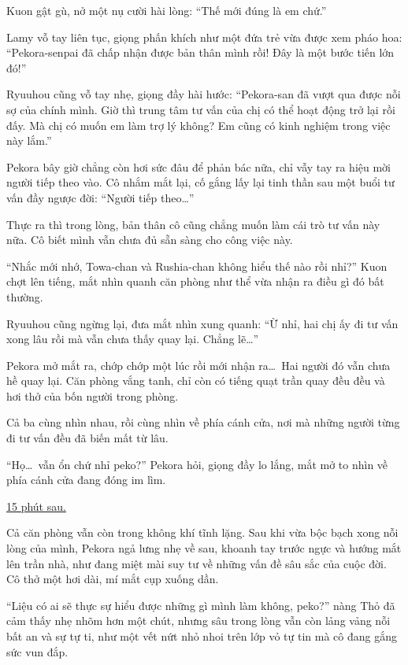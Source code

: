 \documentclass[../main.tex]{subfiles}
\begin{document}
Kuon gật gù, nở một nụ cười hài lòng: ``Thế mới đúng là em chứ.''

Lamy vỗ tay liên tục, giọng phấn khích như một đứa trẻ vừa được xem pháo hoa: ``Pekora-senpai đã chấp nhận được bản thân mình rồi! Đây là một bước tiến lớn đó!''

Ryuuhou cũng vỗ tay nhẹ, giọng đầy hài hước: ``Pekora-san đã vượt qua được nỗi sợ của chính mình. Giờ thì trung tâm tư vấn của chị có thể hoạt động trở lại rồi đấy. Mà chị có muốn em làm trợ lý không? Em cũng có kinh nghiệm trong việc này lắm.''

Pekora bây giờ chẳng còn hơi sức đâu để phản bác nữa, chỉ vẫy tay ra hiệu mời người tiếp theo vào. Cô nhắm mắt lại, cố gắng lấy lại tinh thần sau một buổi tư vấn đầy ngược đời: ``Người tiếp theo\dots''

Thực ra thì trong lòng, bản thân cô cũng chẳng muốn làm cái trò tư vấn này nữa. Cô biết mình vẫn chưa đủ sẵn sàng cho công việc này.

``Nhắc mới nhớ, Towa-chan và Rushia-chan không hiểu thế nào rồi nhỉ?'' Kuon chợt lên tiếng, mắt nhìn quanh căn phòng như thể vừa nhận ra điều gì đó bất thường.

Ryuuhou cũng ngừng lại, đưa mắt nhìn xung quanh: ``Ừ nhỉ, hai chị ấy đi tư vấn xong lâu rồi mà vẫn chưa thấy quay lại. Chẳng lẽ\dots''

Pekora mở mắt ra, chớp chớp một lúc rồi mới nhận ra\dots\ Hai người đó vẫn chưa hề quay lại. Căn phòng vắng tanh, chỉ còn có tiếng quạt trần quay đều đều và hơi thở của bốn người trong phòng.

Cả ba cùng nhìn nhau, rồi cùng nhìn về phía cánh cửa, nơi mà những người từng đi tư vấn đều đã biến mất từ lâu.

``Họ\dots\ vẫn ổn chứ nhỉ peko?'' Pekora hỏi, giọng đầy lo lắng, mắt mở to nhìn về phía cánh cửa đang đóng im lìm.

\omk

\begin{center}
  \uline{15 phút sau.}
\end{center}

Cả căn phòng vẫn còn trong không khí tĩnh lặng. Sau khi vừa bộc bạch xong nỗi lòng của mình, Pekora ngả lưng nhẹ về sau, khoanh tay trước ngực và hướng mắt lên trần nhà, như đang miệt mài suy tư về những vấn đề sâu sắc của cuộc đời. Cô thở một hơi dài, mí mắt cụp xuống dần.

``Liệu có ai sẽ thực sự hiểu được những gì mình làm không, peko?'' nàng Thỏ đã cảm thấy nhẹ nhõm hơn một chút, nhưng sâu trong lòng vẫn còn lảng vảng nỗi bất an và sự tự ti, như một vết nứt nhỏ nhoi trên lớp vỏ tự tin mà cô đang gắng sức vun đắp.
\end{document}
